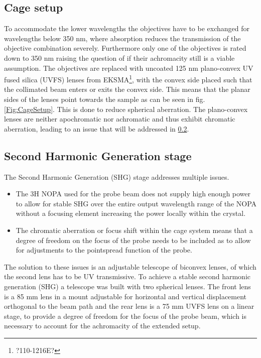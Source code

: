 \documentclass[twoside,openright]{scrreprt}
\begin{document}
\subsection{Cage setup}
To accommodate the lower wavelengths the objectives have to be exchanged for wavelengths below 350 nm, where absorption reduces the transmission of the objective combination severely. Furthermore only one of the objectives is rated down to 350 nm raising the question of if their achromacity still is a viable assumption.\newline
The objectives are replaced with  uncoated 125 nm plano-convex UV fused silica (UVFS) lenses from EKSMA\footnote{?110-1216E?}, with the convex side placed such that the collimated beam enters or exits the convex side. This means that the planar sides of the lenses point towards the sample as can be seen in fig. \protect\ref{Fig:CageSetup}. This is done to reduce spherical aberration.
\newline
The plano-convex lenses are neither apochromatic nor achromatic and thus exhibit chromatic aberration, leading to an issue that will be addressed in \ref{SHG-Stage-desc}. \newline

\subsection{Second Harmonic Generation stage}\label{SHG-Stage-desc}
The Second Harmonic Generation (SHG) stage addresses multiple issues. 
\begin{itemize}
\item The 3H NOPA used for the probe beam does not supply high enough power to allow for stable SHG over the entire output wavelength range of the NOPA without a focusing element increasing the power locally within the crystal. 
\item The chromatic aberration or focus shift within the cage system means that a degree of freedom on the focus of the probe needs to be included as to allow for adjustments to the pointspread function of the probe.
\end{itemize}


The solution to these issues is an adjustable telescope of biconvex lenses, of which the second lens has to be UV transmissive. To achieve a stable second harmonic generation (SHG) a telescope was built with two spherical lenses. The front lens is a 85 mm lens in a mount adjustable for horizontal and vertical displacement orthogonal to the beam path and the rear lens is a 75 mm UVFS lens on a linear stage, to provide a degree of freedom for the focus of the probe beam, which is necessary to account for the achromacity of the extended setup.
\end{document}
